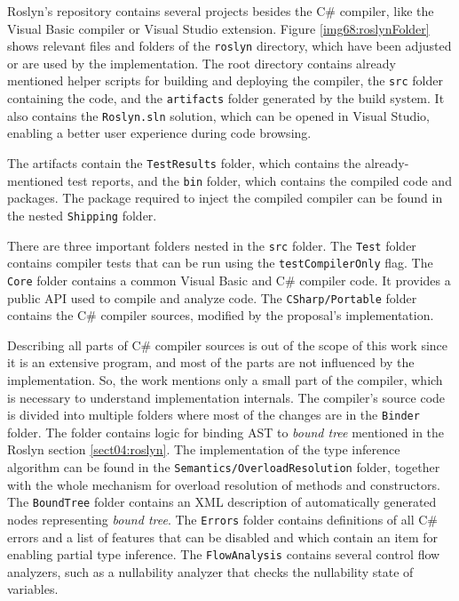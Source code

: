 Roslyn’s repository contains several projects besides the C\# compiler, like the Visual Basic compiler or Visual Studio extension. 
Figure \ref{img68:roslynFolder} shows relevant files and folders of the \texttt{roslyn} directory, which have been adjusted or are used by the implementation. 
The root directory contains already mentioned helper scripts for building and deploying the compiler, the \texttt{src} folder containing the code, and the \texttt{artifacts} folder generated by the build system.
It also contains the \texttt{Roslyn.sln} solution, which can be opened in Visual Studio, enabling a better user experience during code browsing.
\par
The artifacts contain the \texttt{TestResults} folder, which contains the already-mentioned test reports, and the \texttt{bin} folder, which contains the compiled code and packages. 
The package required to inject the compiled compiler can be found in the nested \texttt{Shipping} folder.
\par
There are three important folders nested in the \texttt{src} folder. 
The \texttt{Test} folder contains compiler tests that can be run using the \texttt{testCompilerOnly} flag. 
The \texttt{Core} folder contains a common Visual Basic and C\# compiler code. 
It provides a public API used to compile and analyze code. 
The \texttt{CSharp/Portable} folder contains the C\# compiler sources, modified by the proposal’s implementation.
\par
Describing all parts of C\# compiler sources is out of the scope of this work since it is an extensive program, and most of the parts are not influenced by the implementation. 
So, the work mentions only a small part of the compiler, which is necessary to understand implementation internals. 
The compiler’s source code is divided into multiple folders where most of the changes are in the \texttt{Binder} folder. 
The folder contains logic for binding \ac{AST} to \textit{bound tree} mentioned in the Roslyn section \ref{sect04:roslyn}. 
The implementation of the type inference algorithm can be found in the \texttt{Semantics/OverloadResolution} folder, together with the whole mechanism for overload resolution of methods and constructors. 
The \texttt{BoundTree} folder contains an XML description of automatically generated nodes representing \textit{bound tree}. 
The \texttt{Errors} folder contains definitions of all C\# errors and a list of features that can be disabled and which contain an item for enabling partial type inference. 
The \texttt{FlowAnalysis} contains several control flow analyzers, such as a nullability analyzer that checks the nullability state of variables. 
